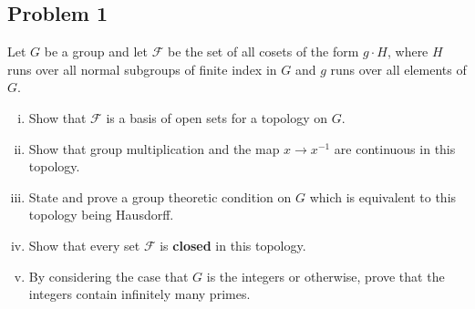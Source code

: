 \documentclass[12pt]{article}
\newcommand\inv[1]{#1^{-1}}
\theoremstyle{definition}
\begin{document}
\subsection{Problem 1 \texorpdfstring{\cite{DF,Rico}}{}}
Let $G$ be a group and let $\mathcal{F}$ be the set of all cosets of the form $g \cdot H$, where $H$ runs over all normal subgroups of finite index in $G$ and $g$ runs over all elements of $G$.
\begin{enumerate}[(i)]
    \item Show that $\mathcal{F}$ is a basis of open sets for a topology on $G$.
    \item Show that group multiplication and the map $x \to \inv{x}$ are continuous in this topology.
    \item State and prove a group theoretic condition on $G$ which is equivalent to this topology being Hausdorff.
    \item Show that every set $\mathcal{F}$ is \textbf{closed} in this topology.
    \item By considering the case that $G$ is the integers or otherwise, prove that the integers contain infinitely many primes.
\end{enumerate}
\end{document}
